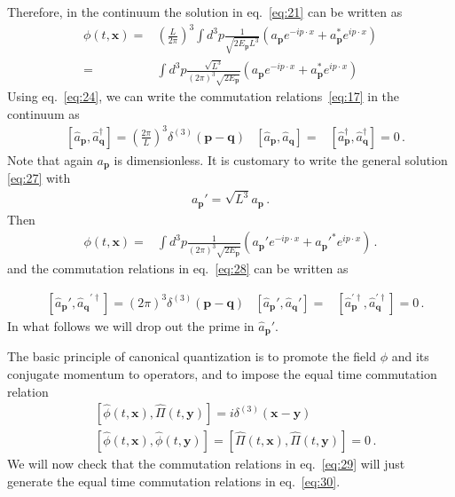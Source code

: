 Therefore, in the continuum the solution in eq.~\eqref{eq:21} can be written as
\begin{align}
\label{eq:27}
  \phi(t,\mathbf{x})=&\left(\frac{L}{2\pi}\right)^3\int d^3p \frac{1}{\sqrt{2E_\mathbf{p} L^3}}
  \left(a_\mathbf{p} e^{-i p\cdot x }+a_\mathbf{p}^* e^{i p\cdot x }\right)\nonumber\\
=&\int d^3p \frac{\sqrt{L^3}}{(2\pi)^3\sqrt{2E_\mathbf{p} }}
  \left(a_\mathbf{p} e^{-i p\cdot x }+a_\mathbf{p}^* e^{i p\cdot x }\right)
\end{align}
Using eq.~\eqref{eq:24}, we can write the commutation relations~\eqref{eq:17} in the continuum as
\begin{align}
\label{eq:28}
  &\left[\widehat{a}_\mathbf{p},\widehat{a}_\mathbf{q}^\dagger\right]=
\left(\frac{2\pi}{L}\right)^3\delta^{(3)}(\mathbf{p}-\mathbf{q})
&\left[\widehat{a}_\mathbf{p},\widehat{a}_\mathbf{q}\right]=&
\left[\widehat{a}_\mathbf{p}^\dagger,\widehat{a}_\mathbf{q}^\dagger\right]=0\,.
\end{align}
Note that again $a_{\mathbf{p}}$ is dimensionless. It is customary to write the general solution \eqref{eq:27} with
\begin{align}
  a_{\mathbf{p}}'=\sqrt{L^3}a_{\mathbf{p}}\,.
\end{align}
Then
\begin{align}
  \phi(t,\mathbf{x})=&\int d^3p \frac{1}{(2\pi)^3\sqrt{2E_\mathbf{p} }}
  \left(a_\mathbf{p}' e^{-i p\cdot x }+{a_\mathbf{p}'}^* e^{i p\cdot x }\right)\,.
\end{align}
and the commutation relations in eq.~\eqref{eq:28} can be written as

\begin{align}
\label{eq:29}
  &\left[\widehat{a}_{\mathbf{p}}',{\widehat{a}_{\mathbf{q}}}^{\prime \dagger}\right]=
\left(2\pi\right)^3\delta^{(3)}(\mathbf{p}-\mathbf{q})
&\left[\widehat{a}_{\mathbf{p}}',\widehat{a}_{\mathbf{q}}'\right]=&
\left[\widehat{a}_\mathbf{p}^{\prime\dagger},\widehat{a}_\mathbf{q}^{\prime\dagger}\right]=0\,.
\end{align}
In what follows we will drop out the prime in $\widehat{a}_{\mathbf{p}}'$.


The basic principle of canonical quantization is to promote the field $\phi$ and its conjugate momentum to operators, and to impose the equal time commutation relation
\begin{align}
  \label{eq:30}
  &\left[\widehat{\phi}(t,\mathbf{x}),\widehat{\Pi}(t,\mathbf{y})\right]=
  i\delta^{(3)}(\mathbf{x}-\mathbf{y})\nonumber\\
  &\left[\widehat{\phi}(t,\mathbf{x}),\widehat{\phi}(t,\mathbf{y})\right]=
  \left[\widehat{\Pi}(t,\mathbf{x}),\widehat{\Pi}(t,\mathbf{y})\right]=
  0\,.
\end{align}
We will now check that the commutation relations in eq.~\eqref{eq:29} will just generate the equal time commutation relations in eq.~\eqref{eq:30}.

